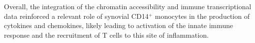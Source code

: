 




Overall, the integration of the chromatin accessibility and immune transcriptional data reinforced a relevant role of synovial CD14$^+$ monocytes in the production of cytokines and chemokines, likely leading to activation of the innate immune response and the recruitment of T cells to this site of inflammation. 


